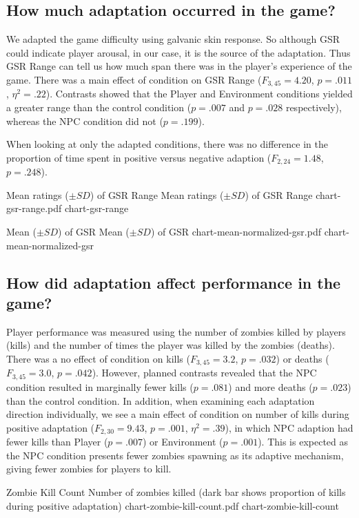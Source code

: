 \subsection{How much adaptation occurred in the game?}

We adapted the game difficulty using galvanic skin response. So although GSR could indicate player arousal, in our case, it is the source of the adaptation. Thus GSR Range can tell us how much span there was in the player's experience of the game. There was a main effect of condition on GSR Range ($F_{3,45} = 4.20$, $p = .011$, $\eta^{2} = .22$). Contrasts showed that the Player and Environment conditions yielded a greater range than the control condition ($p = .007$ and $p = .028$ respectively), whereas the NPC condition did not ($p = .199$).

When looking at only the adapted conditions, there was no difference in the proportion of time spent in positive versus negative adaption ($F_{2,24} = 1.48$, $p = .248$).

\img
{Mean ratings ($\pm SD$) of GSR Range}
{Mean ratings ($\pm SD$) of GSR Range}
{chart-gsr-range.pdf}
{chart-gsr-range}

\img
{Mean ($\pm SD$) of GSR}
{Mean ($\pm SD$) of GSR}
{chart-mean-normalized-gsr.pdf}
{chart-mean-normalized-gsr}


\subsection{How did adaptation affect performance in the game?}

Player performance was measured using the number of zombies killed by players (kills) and the number of times the player was killed by the zombies (deaths). There was a no effect of condition on kills ($F_{3,45} = 3.2$, $p = .032$) or deaths ($F_{3,45} = 3.0$, $p = .042$). However, planned contrasts revealed that the NPC condition resulted in marginally fewer kills ($p = .081$) and more deaths ($p = .023$) than the control condition. In addition, when examining each adaptation direction individually, we see a main effect of condition on number of kills during positive adaptation ($F_{2,30} = 9.43$, $p = .001$, $\eta^{2} = .39$), in which NPC adaption had fewer kills than Player ($p = .007$) or Environment ($p = .001$). This is expected as the NPC condition presents fewer zombies spawning as its adaptive mechanism, giving fewer zombies for players to kill.

\img
{Zombie Kill Count}
{Number of zombies killed (dark bar shows proportion of kills during positive adaptation)}
{chart-zombie-kill-count.pdf}
{chart-zombie-kill-count}

